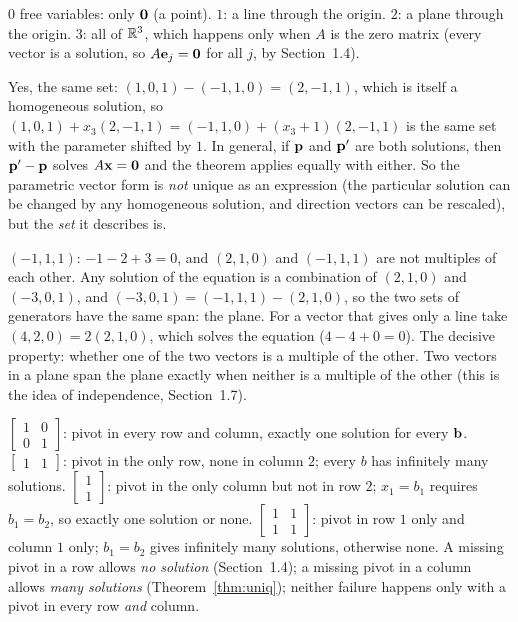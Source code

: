 \documentclass[11pt]{article}
\begin{document}
\begin{description}[leftmargin=0pt,itemsep=5pt]
  \item[Knowledge Check \ref{kc:shape}.] $0$ free variables: only $\mathbf{0}$ (a point). $1$: a line through the origin. $2$: a plane through the origin. $3$: all of $\mathbb{R}^3$, which happens only when $A$ is the zero matrix (every vector is a solution, so $A\mathbf{e}_j=\mathbf{0}$ for all $j$, by Section~1.4).
  \item[Pause and think \ref{think:partic}.] Yes, the same set: $(1,0,1)-(-1,1,0)=(2,-1,1)$, which is itself a homogeneous solution, so $(1,0,1)+x_3(2,-1,1)=(-1,1,0)+(x_3+1)(2,-1,1)$ is the same set with the parameter shifted by $1$. In general, if $\mathbf{p}$ and $\mathbf{p}'$ are both solutions, then $\mathbf{p}'-\mathbf{p}$ solves $A\mathbf{x}=\mathbf{0}$ and the theorem applies equally with either. So the parametric vector form is \emph{not} unique as an expression (the particular solution can be changed by any homogeneous solution, and direction vectors can be rescaled), but the \emph{set} it describes is.
  \item[Pause and think \ref{think:build}.] $(-1,1,1)$: $-1-2+3=0$, and $(2,1,0)$ and $(-1,1,1)$ are not multiples of each other. Any solution of the equation is a combination of $(2,1,0)$ and $(-3,0,1)$, and $(-3,0,1)=(-1,1,1)-(2,1,0)$, so the two sets of generators have the same span: the plane. For a vector that gives only a line take $(4,2,0)=2(2,1,0)$, which solves the equation ($4-4+0=0$). The decisive property: whether one of the two vectors is a multiple of the other. Two vectors in a plane span the plane exactly when neither is a multiple of the other (this is the idea of independence, Section~1.7).
  \item[Pause and think \ref{think:table}.] $\begin{bmatrix}1&0\\0&1\end{bmatrix}$: pivot in every row and column, exactly one solution for every $\mathbf{b}$. $\begin{bmatrix}1&1\end{bmatrix}$: pivot in the only row, none in column $2$; every $b$ has infinitely many solutions. $\begin{bmatrix}1\\1\end{bmatrix}$: pivot in the only column but not in row $2$; $x_1=b_1$ requires $b_1=b_2$, so exactly one solution or none. $\begin{bmatrix}1&1\\1&1\end{bmatrix}$: pivot in row $1$ only and column $1$ only; $b_1=b_2$ gives infinitely many solutions, otherwise none. A missing pivot in a row allows \emph{no solution} (Section~1.4); a missing pivot in a column allows \emph{many solutions} (Theorem~\ref{thm:uniq}); neither failure happens only with a pivot in every row \emph{and} column.

\end{description}
\end{document}
